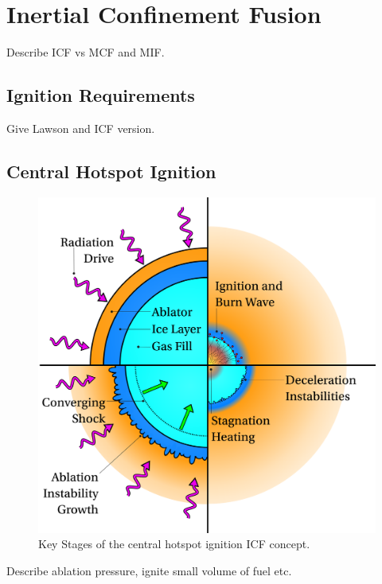 \section{Inertial Confinement Fusion}%
\label{sec:intro_ICF}

Describe ICF vs MCF and MIF.

\subsection{Ignition Requirements}%
\label{sec:intro_icf_ignition}

Give Lawson and ICF version.

\subsection{Central Hotspot Ignition}%
\label{sec:intro_centralhotspot}

\begin{figure}[t!]
    \includegraphics[width=0.7\linewidth]{Introduction/Images/hotspot ignition white.png}
    \centering
    \caption{Key Stages of the central hotspot ignition \ac{ICF} concept.
    }%
    \label{fig:intro_hotspot}
\end{figure}

Describe ablation pressure, ignite small volume of fuel etc.

